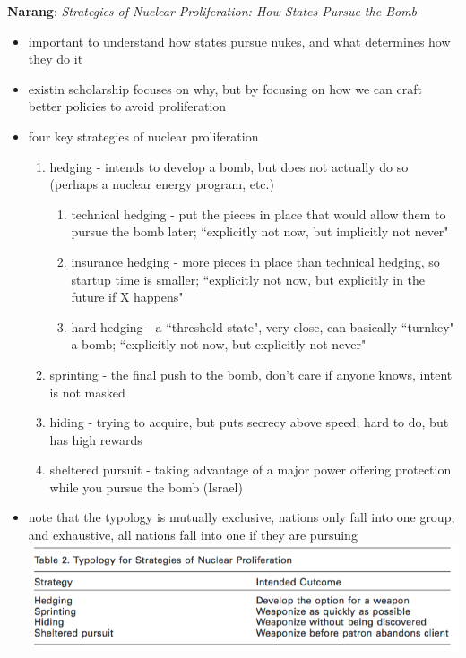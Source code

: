 \documentclass{article}
\begin{document}
\bigskip
\textbf{Narang}: \textit{Strategies of Nuclear Proliferation: How States Pursue the Bomb}
\begin{itemize}
    \item important to understand how states pursue nukes, and what determines how they do it
    \item existin scholarship focuses on why, but by focusing on how we can craft better policies to avoid proliferation
    \item four key strategies of nuclear proliferation
    \begin{enumerate}
        \item hedging - intends to develop a bomb, but does not actually do so (perhaps a nuclear energy program, etc.)
        \begin{enumerate}
            \item technical hedging - put the pieces in place that would allow them to pursue the bomb later; ``explicitly not now, but implicitly not never"
            \item insurance hedging - more pieces in place than technical hedging, so startup time is smaller; ``explicitly not now, but explicitly in the future if X happens"
            \item hard hedging - a ``threshold state", very close, can basically ``turnkey" a bomb; ``explicitly not now, but explicitly not never"
        \end{enumerate}
        \item sprinting - the final push to the bomb, don't care if anyone knows, intent is not masked
        \item hiding - trying to acquire, but puts secrecy above speed; hard to do, but has high rewards
        \item sheltered pursuit - taking advantage of a major power offering protection while you pursue the bomb (Israel)
    \end{enumerate}
    \item note that the typology is mutually exclusive, nations only fall into one group, and exhaustive, all nations fall into one if they are pursuing\\
    \includegraphics[width=\textwidth]{pursuitstrats.png}

\end{itemize}
\end{document}
